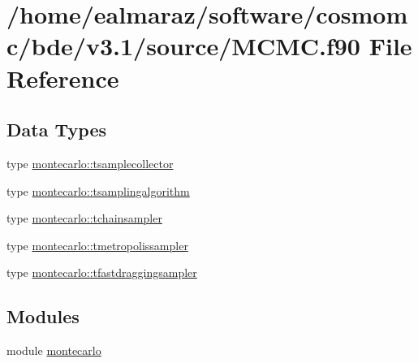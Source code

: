 \hypertarget{MCMC_8f90}{}\section{/home/ealmaraz/software/cosmomc/bde/v3.1/source/\+M\+C\+MC.f90 File Reference}
\label{MCMC_8f90}
\subsection*{Data Types}
\begin{DoxyCompactItemize}
\item 
type \mbox{\hyperlink{structmontecarlo_1_1tsamplecollector}{montecarlo\+::tsamplecollector}}
\item 
type \mbox{\hyperlink{structmontecarlo_1_1tsamplingalgorithm}{montecarlo\+::tsamplingalgorithm}}
\item 
type \mbox{\hyperlink{structmontecarlo_1_1tchainsampler}{montecarlo\+::tchainsampler}}
\item 
type \mbox{\hyperlink{structmontecarlo_1_1tmetropolissampler}{montecarlo\+::tmetropolissampler}}
\item 
type \mbox{\hyperlink{structmontecarlo_1_1tfastdraggingsampler}{montecarlo\+::tfastdraggingsampler}}
\end{DoxyCompactItemize}
\subsection*{Modules}
\begin{DoxyCompactItemize}
\item 
module \mbox{\hyperlink{namespacemontecarlo}{montecarlo}}
\end{DoxyCompactItemize}
